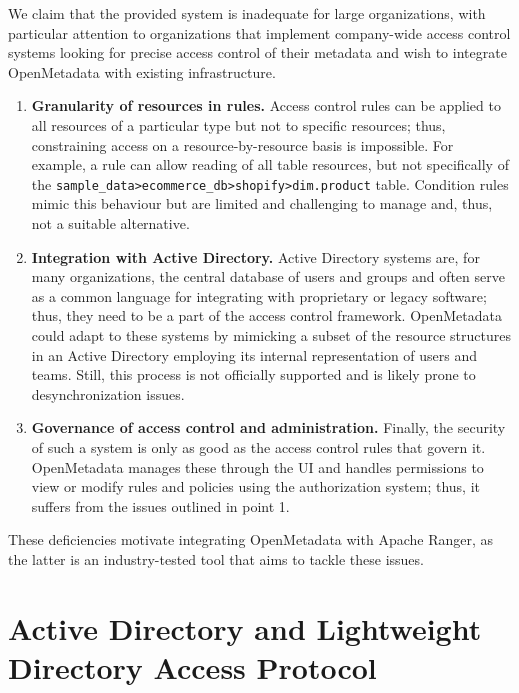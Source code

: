 We claim that the provided system is inadequate for large organizations, with particular attention to organizations that implement company-wide access control systems looking for precise access control of their metadata and wish to integrate OpenMetadata with existing infrastructure.

\begin{enumerate}

    \item \textbf{Granularity of resources in rules.} Access control rules can be applied to all resources of a particular type but not to specific resources; thus, constraining access on a resource-by-resource basis is impossible. For example, a rule can allow reading of all table resources, but not specifically of the \texttt{sample_data>ecommerce_db>shopify>dim.product} table. Condition rules mimic this behaviour but are limited and challenging to manage and, thus, not a suitable alternative.

    \item \textbf{Integration with Active Directory.} Active Directory systems are, for many organizations, the central database of users and groups and often serve as a common language for integrating with proprietary or legacy software; thus, they need to be a part of the access control framework. OpenMetadata could adapt to these systems by mimicking a subset of the resource structures in an Active Directory employing its internal representation of users and teams. Still, this process is not officially supported and is likely prone to desynchronization issues.

    \item \textbf{Governance of access control and administration.} Finally, the security of such a system is only as good as the access control rules that govern it. OpenMetadata manages these through the UI and handles permissions to view or modify rules and policies using the authorization system; thus, it suffers from the issues outlined in point 1.

\end{enumerate}

These deficiencies motivate integrating OpenMetadata with Apache Ranger, as the latter is an industry-tested tool that aims to tackle these issues.

\section{Active Directory and Lightweight Directory Access Protocol}

